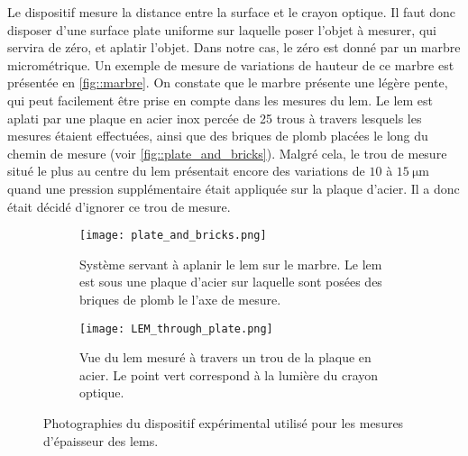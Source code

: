            Le dispositif mesure la distance entre la surface et le crayon optique. Il faut donc disposer d'une surface plate uniforme sur laquelle poser l'objet à mesurer, qui servira de zéro, et aplatir l'objet. Dans notre cas, le zéro est donné  par un marbre micrométrique. Un exemple de mesure de variations de hauteur de ce marbre est présentée en \autoref{fig::marbre}. On constate que le marbre présente une légère pente, qui peut facilement être prise en compte dans les mesures du \gls{lem}. Le \gls{lem} est aplati par une plaque en acier inox percée de 25 trous à travers lesquels les mesures étaient effectuées, ainsi que des briques de plomb placées le long du chemin de mesure (voir \autoref{fig::plate_and_bricks}). Malgré cela, le trou de mesure situé le plus au centre du \gls{lem} présentait encore des variations de $10$ à $\SI{15}{\micro\meter}$ quand une pression supplémentaire était appliquée sur la plaque d'acier. Il a donc était décidé d'ignorer ce trou de mesure.

          \begin{figure}[htpb]
            \begin{subfigure}[t]{0.5\textwidth}
              \centering
              \texttt{[image: plate\_and\_bricks.png]}
              \caption{\label{fig::plate_and_bricks}Système servant à aplanir le \gls{lem} sur le marbre. Le \gls{lem} est sous une plaque d'acier sur laquelle sont posées des briques de plomb le l'axe de mesure.}
            \end{subfigure}
            \hfill
            \begin{subfigure}[t]{0.395\textwidth}
              \centering
              \texttt{[image: LEM\_through\_plate.png]}
              \caption{\label{fig::LEM_through_plate}Vue du \gls{lem} mesuré à travers un trou de la plaque en acier. Le point vert correspond à la lumière du crayon optique.}
            \end{subfigure}
            \caption[Photographies du dispositif expérimental utilisé pour les mesures d'épaisseur des LEM]{\label{fig::dispositif_experimental}Photographies du dispositif expérimental utilisé pour les mesures d'épaisseur des \glspl{lem}.}
          \end{figure}

